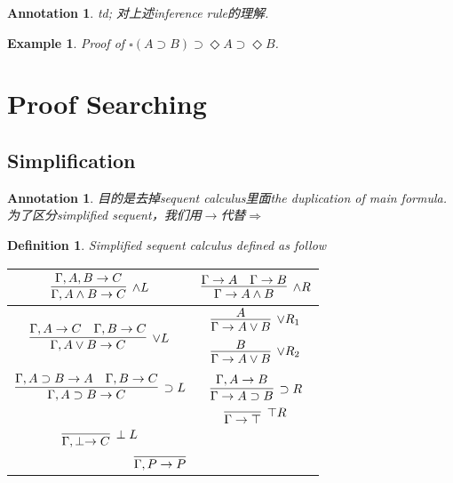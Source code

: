 \documentclass{article}
\theoremstyle{plain}
\newtheorem{example}[theorem]{Example}
\newtheorem{definition}[theorem]{Definition}
\newtheorem{annotation}[theorem]{Annotation}
\theoremstyle{nonumberplain}
\begin{document}
\begin{annotation}
\rm td; 对上述inference rule的理解. 
\end{annotation}

\begin{example}
\rm Proof of $\square(A \supset B) \supset \Diamond A \supset \Diamond B$.
\end{example}


\newpage
\section{Proof Searching}

\subsection{Simplification}

\begin{annotation}
\rm 目的是去掉sequent calculus里面the duplication of main formula. 为了区分simplified sequent，我们用$\to$代替$\Rightarrow$
\end{annotation}

\begin{definition}
\rm \cite{15-317-rsc}Simplified sequent calculus defined as follow
\begin{center}
\begin{tabular}{|c|c|}
\hline $\infer[\wedge L]{\Gamma, A \wedge B \to C}{\Gamma, A, B \to C}$  & $\infer[\wedge R]{\Gamma \to A \wedge B}{\Gamma \to A & \Gamma \to B}$ \rule{0em}{3em} \\
\hline $\infer[\vee L]{\Gamma, A \vee B \to C}{\Gamma, A \to C & \Gamma, B \to C}$ & $\begin{aligned}\infer[\vee R_1]{\Gamma \to A \vee B}{A} \\ \infer[\vee R_2]{\Gamma\to A \vee B}{B} \end{aligned}$ \rule{0em}{3em}\\
\hline $\infer[\supset L]{\Gamma, A \supset B \to C}{\Gamma, A \supset B \to A & \Gamma, B \to C}$ & $\infer[\supset R]{\Gamma \to A \supset B}{\Gamma, A \to B}$ \rule{0em}{3em} \\
\hline & $\infer[\top R]{\Gamma \to \top}{}$ \rule{0em}{2em}\\
\hline $\infer[\perp L]{\Gamma, \perp \to C}{}$ & \rule{0em}{2em}\\
\hline \multicolumn{2}{|c|}{$\infer[]{\Gamma,P \to P}{}$}\rule{0em}{2em}\\
\hline
\end{tabular}
\end{center}
\end{definition}
\end{document}
